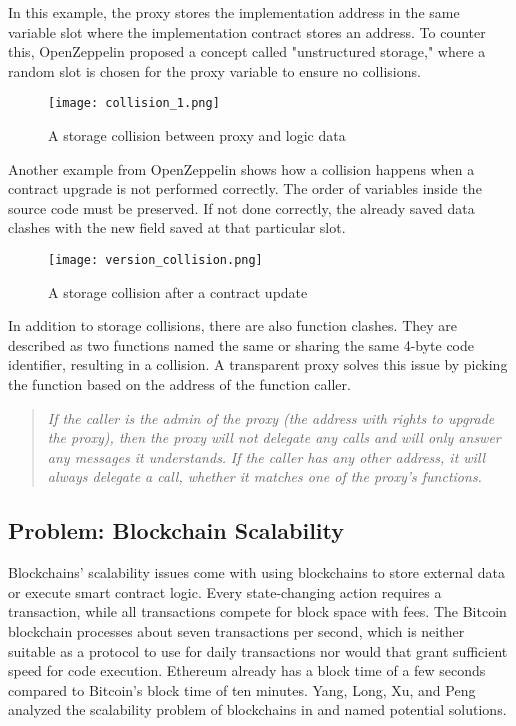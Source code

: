 In this example, the proxy stores the implementation address in the same variable slot where the implementation contract stores an address.
To counter this, OpenZeppelin proposed a concept called "unstructured storage," where a random slot is chosen for the proxy variable to ensure no collisions.
\begin{figure}[htpb]
   \centering
   \texttt{[image: collision\_1.png]}
   \caption{
       A storage collision between proxy and logic data \cite{zeppelin_proxy}
   }
\end{figure}


Another example from OpenZeppelin shows how a collision happens when a contract upgrade is not performed correctly.
The order of variables inside the source code must be preserved.
If not done correctly, the already saved data clashes with the new field saved at that particular slot.
\begin{figure}[htpb]
   \centering
   \texttt{[image: version\_collision.png]}
   \caption{
       A storage collision after a contract update \cite{zeppelin_proxy}
   }
\end{figure}

In addition to storage collisions, there are also function clashes.
They are described as two functions named the same or sharing the same 4-byte code identifier, resulting in a collision.
A transparent proxy solves this issue by picking the function based on the address of the function caller.

\begin{quote}
\centering 
   \textit{If the caller is the admin of the proxy (the address with rights to upgrade the proxy), then the proxy will not delegate any calls and will only answer any messages it understands.}
   \textit{If the caller has any other address, it will always delegate a call, whether it matches one of the proxy's functions.} \cite{zeppelin_proxy}
\end{quote}


\subsection{Problem: Blockchain Scalability}
Blockchains' scalability issues come with using blockchains to store external data or execute smart contract logic.
Every state-changing action requires a transaction, while all transactions compete for block space with fees.
The Bitcoin blockchain processes about seven transactions per second, which is neither suitable as a protocol to use for daily transactions nor would that grant
sufficient speed for code execution. Ethereum already has a block time of a few seconds compared to Bitcoin's block time of ten minutes.
Yang, Long, Xu, and Peng analyzed the scalability problem of blockchains in \cite{blockchain_scalability} and named potential solutions.

